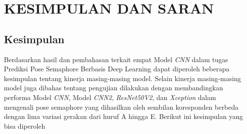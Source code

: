 
\chapter{KESIMPULAN DAN SARAN}

\section{Kesimpulan}
Berdasarkan hasil dan pembahasan terkait empat Model \textit{CNN} dalam tugas Prediksi Pose Semaphore Berbasis Deep Learning dapat diperoleh beberapa kesimpulan tentang kinerja masing-masing model. Selain kinerja masing-masing model juga dibahas tentang pengujian dilakukan dengan membandingkan performa Model \textit{CNN}, Model \textit{CNN2}, \textit{ResNet50V2}, dan \textit{Xception} dalam mengenali pose semaphore yang dihasilkan oleh sembilan koresponden berbeda dengan lima variasi gerakan dari huruf A hingga E. Berikut ini kesimpulan yang bisa diperoleh 
